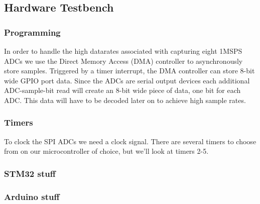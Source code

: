 \documentclass[11pt, a4paper]{article}
\begin{document}
\subsection{Hardware Testbench}

\subsubsection{Programming}

In order to handle the high datarates associated with capturing eight 1MSPS ADCs we use the Direct Memory Access (DMA) controller to asynchronously store samples.
Triggered by a timer interrupt, the DMA controller can store 8-bit wide GPIO port data.
Since the ADCs are serial output devices each additional ADC-sample-bit read will create an 8-bit wide piece of data, one bit for each ADC.
This data will have to be decoded later on to achieve high sample rates.

\subsubsection{Timers}

To clock the SPI ADCs we need a clock signal.   
There are several timers to choose from on our microcontroller of choice, but we'll look at timers 2-5.

\subsubsection{STM32 stuff}

\subsubsection{Arduino stuff}

\begin{thebibliography}{1}
\end{thebibliography}
\end{document}
